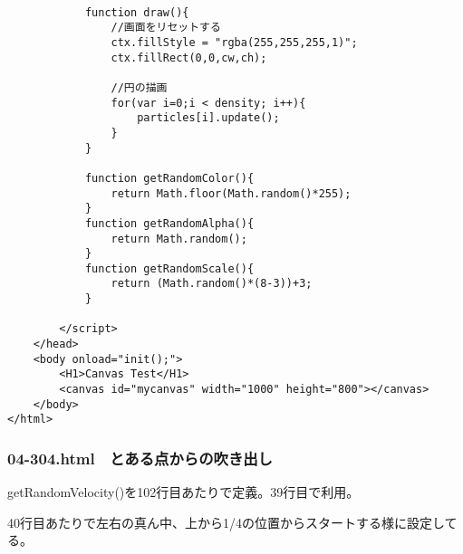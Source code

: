 \documentclass[mingoth,11pt,a4j,uplatex]{jsarticle}
\begin{document}
\begin{lstlisting}[caption=床の跳ね返りをシミュレーション]
			
			function draw(){
				//画面をリセットする
				ctx.fillStyle = "rgba(255,255,255,1)";
				ctx.fillRect(0,0,cw,ch);
				
				//円の描画
				for(var i=0;i < density; i++){
					particles[i].update();
				}
			}

			function getRandomColor(){
				return Math.floor(Math.random()*255);
			}
			function getRandomAlpha(){
				return Math.random();
			}
			function getRandomScale(){
				return (Math.random()*(8-3))+3;
			}
			
		</script>
	</head>
	<body onload="init();">
		<H1>Canvas Test</H1>
		<canvas id="mycanvas" width="1000" height="800"></canvas>
	</body>
</html>
\end{lstlisting}

\subsubsection{04-304.html　とある点からの吹き出し}
getRandomVelocity()を102行目あたりで定義。39行目で利用。

40行目あたりで左右の真ん中、上から1/4の位置からスタートする様に設定してる。
\end{document}
